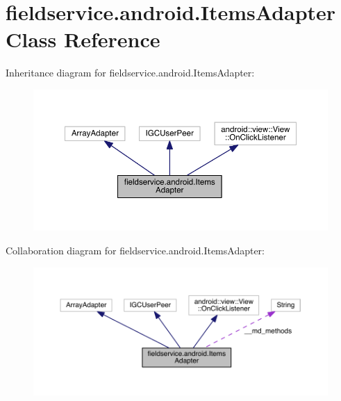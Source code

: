 \hypertarget{classfieldservice_1_1android_1_1_items_adapter}{\section{fieldservice.\+android.\+Items\+Adapter Class Reference}
\label{classfieldservice_1_1android_1_1_items_adapter}
}


Inheritance diagram for fieldservice.\+android.\+Items\+Adapter\+:
\nopagebreak
\begin{figure}[H]
\begin{center}
\leavevmode
\includegraphics[width=350pt]{classfieldservice_1_1android_1_1_items_adapter__inherit__graph}
\end{center}
\end{figure}


Collaboration diagram for fieldservice.\+android.\+Items\+Adapter\+:
\nopagebreak
\begin{figure}[H]
\begin{center}
\leavevmode
\includegraphics[width=350pt]{classfieldservice_1_1android_1_1_items_adapter__coll__graph}
\end{center}
\end{figure}
